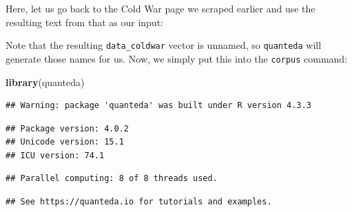 \documentclass[
]{book}
\newenvironment{Shaded}{\begin{snugshade}}{\end{snugshade}}
\newcommand{\DecValTok}[1]{\textcolor[rgb]{0.00,0.00,0.81}{#1}}
\newcommand{\FunctionTok}[1]{\textcolor[rgb]{0.13,0.29,0.53}{\textbf{#1}}}
\newcommand{\NormalTok}[1]{#1}
\newcommand{\OtherTok}[1]{\textcolor[rgb]{0.56,0.35,0.01}{#1}}
\newcommand{\SpecialCharTok}[1]{\textcolor[rgb]{0.81,0.36,0.00}{\textbf{#1}}}
\newcommand{\StringTok}[1]{\textcolor[rgb]{0.31,0.60,0.02}{#1}}
\begin{document}
Here, let us go back to the Cold War page we scraped earlier and use the resulting text from that as our input:

\begin{Shaded}
\end{Shaded}

Note that the resulting \texttt{data\_coldwar} vector is unnamed, so \texttt{quanteda} will generate those names for us. Now, we simply put this into the \texttt{corpus} command:

\begin{Shaded}
\begin{Highlighting}[]
\FunctionTok{library}\NormalTok{(quanteda)}
\end{Highlighting}
\end{Shaded}

\begin{verbatim}
## Warning: package 'quanteda' was built under R version 4.3.3
\end{verbatim}

\begin{verbatim}
## Package version: 4.0.2
## Unicode version: 15.1
## ICU version: 74.1
\end{verbatim}

\begin{verbatim}
## Parallel computing: 8 of 8 threads used.
\end{verbatim}

\begin{verbatim}
## See https://quanteda.io for tutorials and examples.
\end{verbatim}
\end{document}
